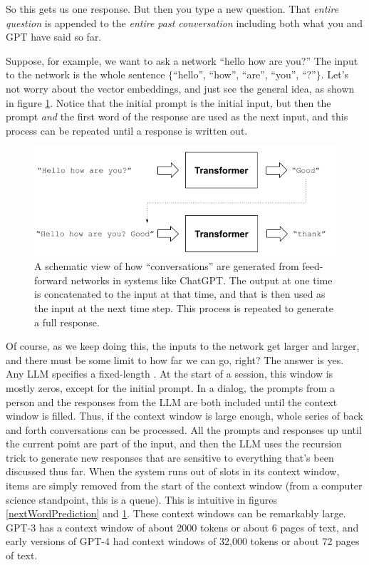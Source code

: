 So this gets us one response. But then you type a new question. That
\emph{entire question} is appended to the \emph{entire past conversation}
including both what you and GPT have said so far. 

Suppose, for example, we want to ask a network ``hello how are you?'' The input
to the network is the whole sentence $\{$``hello'', ``how'', ``are'', ``you'',
``?''$\}$. Let's  not worry about the vector embeddings, and just see the
general idea, as shown in figure \ref{gptRecursedInputs}. Notice that the
initial prompt is the initial input, but then the prompt \emph{and} the first
word of the response are used as the next input, and this process can be
repeated until a response is written out.
  
\begin{figure}[ht]
\centering
\includegraphics[scale=.7]{./images/gptRecursedInputs.png}
\caption[Jeff Yoshimi]{A schematic view of how ``conversations'' are generated
from feed-forward networks in systems like ChatGPT. The output at one time is
concatenated to the input at that time, and that is then used as the input at
the next time step. This process is repeated to generate a full response.
}
\label{gptRecursedInputs}
\end{figure}

Of course, as we keep doing this, the inputs to the network get larger and
larger, and there must be some limit to how far we can go, right? The answer is
yes. Any LLM specifies a fixed-length . At the start
of a session, this window is mostly zeros, except for the initial prompt. In a
dialog, the prompts from a person and the responses from the LLM are both
included until the context window is filled. Thus, if the context window is
large enough, whole series of back and forth conversations can be processed.
All the prompts and responses up until the current point are part of the input,
and then the LLM uses the recursion trick to generate new responses that are
sensitive to everything that's been discussed thus far. When the system runs
out of slots in its context window, items are simply removed from the start of
the context window (from a computer science standpoint, this is a queue). This
is intuitive in figures \ref{nextWordPrediction} and \ref{gptRecursedInputs}.
These context windows can be remarkably large. GPT-3 has a context window of
about 2000 tokens or about 6 pages of text, and early versions of GPT-4 had
context windows of 32,000 tokens or about 72 pages of text. 

